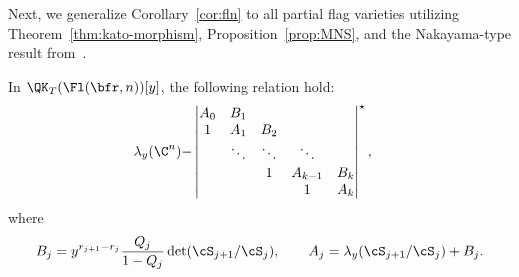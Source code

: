Next, we generalize Corollary~\ref{cor:fln} to all partial flag varieties utilizing Theorem~\ref{thm:kato-morphism}, Proposition~\ref{prop:MNS}, and the Nakayama-type result from~\cite{GMSXZZ:QKW, gu2022quantum}.

\begin{Theorem}\label{thm:whit-short}
 In $\QK_T(\Fl(\bfr,n))[y]$, the following relation hold:
 \begin{align}\label{eqn:whit-short}
 \lambda_y(\C^n)-
 &\begin{vmatrix}
 A_0 & B_1 & & & \\
 1 & A_1 & B_2 & & \\ & \ddots & \ddots & \ddots & \\ & & 1 & A_{k-1} & B_{k}\\ & & & 1 & A_{k}
 \end{vmatrix}^\star,
 \end{align}
 where \[
 B_j=y^{r_{j+1}-r_j}\frac{Q_j}{1-Q_j}\det(\cS_{j+1}/\cS_j),\qquad
 A_j=\lambda_y(\cS_{j+1}/\cS_j)+B_j.
\]
\end{Theorem}
